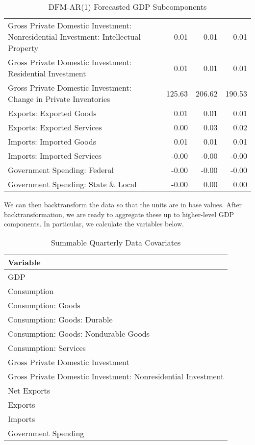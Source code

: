 \documentclass[11pt, letterpaper]{article}\usepackage[]{graphicx}\usepackage[]{color}
\begin{document}
\begin{table}[H]
\begin{tabular}{lrrr}
  Gross Private Domestic Investment: Nonresidential Investment: Intellectual Property & 0.01 & 0.01 & 0.01 \\ 
  Gross Private Domestic Investment: Residential Investment & 0.01 & 0.01 & 0.01 \\ 
  Gross Private Domestic Investment: Change in Private Inventories & 125.63 & 206.62 & 190.53 \\ 
  Exports: Exported Goods & 0.01 & 0.01 & 0.01 \\ 
  Exports: Exported Services & 0.00 & 0.03 & 0.02 \\ 
  Imports: Imported Goods & 0.01 & 0.01 & 0.01 \\ 
  Imports: Imported Services & -0.00 & -0.00 & -0.00 \\ 
  Government Spending: Federal & -0.00 & -0.00 & -0.00 \\ 
  Government Spending: State \& Local & -0.00 & 0.00 & 0.00 \\ 
   \hline
\end{tabular}
\endgroup
\caption{DFM-AR(1) Forecasted GDP Subcomponents} 
\end{table}


We can then backtransform the data so that the units are in base values. After backtransformation, we are ready to aggregate these up to higher-level GDP components. In particular, we calculate the variables below.
\begin{table}[H]
\centering
\begingroup\scriptsize
\begin{tabular}{l}
  \hline
Variable \\ 
  \hline
GDP \\ 
  Consumption \\ 
  Consumption: Goods \\ 
  Consumption: Goods: Durable \\ 
  Consumption: Goods: Nondurable Goods \\ 
  Consumption: Services \\ 
  Gross Private Domestic Investment \\ 
  Gross Private Domestic Investment: Nonresidential Investment \\ 
  Net Exports \\ 
  Exports \\ 
  Imports \\ 
  Government Spending \\ 
   \hline
\end{tabular}
\endgroup
\caption{Summable Quarterly Data Covariates} 
\end{table}
\end{document}
